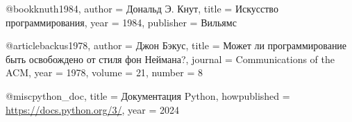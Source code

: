 @book{knuth1984,
	author    = {Дональд Э. Кнут},
	title     = {Искусство программирования},
	year      = {1984},
	publisher = {Вильямс}
}

@article{backus1978,
	author    = {Джон Бэкус},
	title     = {Может ли программирование быть освобождено от стиля фон Неймана?},
	journal   = {Communications of the ACM},
	year      = {1978},
	volume    = {21},
	number    = {8}
}

@misc{python_doc,
	title     = {Документация Python},
	howpublished = {\url{https://docs.python.org/3/}},
	year      = {2024}
}